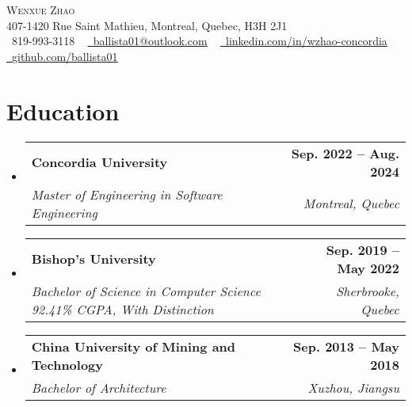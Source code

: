 \documentclass[letterpaper,11pt]{article}
\makeatletter
\newcommand{\resumeSubheading}[4]{
  \vspace{-2pt}\item
    \begin{tabular*}{1.0\textwidth}[t]{l@{\extracolsep{\fill}}r}
      \textbf{#1} & \textbf{\small #2} \\
      \textit{\small#3} & \textit{\small #4} \\
    \end{tabular*}\vspace{-7pt}
}
\newcommand{\resumeSubHeadingListStart}{\begin{itemize}[leftmargin=0.0in, label={}]}
\newcommand{\resumeSubHeadingListEnd}{\end{itemize}}
\makeatother
\begin{document}

\begin{center}
    {\Huge \scshape Wenxue Zhao} \\ \vspace{1pt}
    407-1420 Rue Saint Mathieu, Montreal, Quebec, H3H 2J1 \\ \vspace{1pt}
    \small \raisebox{-0.1\height}\faPhone\ 819-993-3118 ~ \href{mailto:ballista01@outlook.com}{\raisebox{-0.2\height}\faEnvelope\  \underline{ballista01@outlook.com}} ~ 
    \href{https://www.linkedin.com/in/wzhao-concordia/}{\raisebox{-0.2\height}\faLinkedin\ \underline{linkedin.com/in/wzhao-concordia}}  ~
    \href{https://github.com/ballista01}{\raisebox{-0.2\height}\faGithub\ \underline{github.com/ballista01}}
    \vspace{-8pt}
\end{center}


\section{Education}
  \resumeSubHeadingListStart
    \resumeSubheading
      {Concordia University}{Sep. 2022 -- Aug. 2024}
      {Master of Engineering in Software Engineering}{Montreal, Quebec}
    \resumeSubheading
      {Bishop's University}{Sep. 2019 -- May 2022}
      {Bachelor of Science in Computer Science 92.41\% CGPA, With Distinction}{Sherbrooke, Quebec}
    \resumeSubheading
      {China University of Mining and Technology}{Sep. 2013 -- May 2018}
      {Bachelor of Architecture}{Xuzhou, Jiangsu}
  \resumeSubHeadingListEnd

\end{document}
